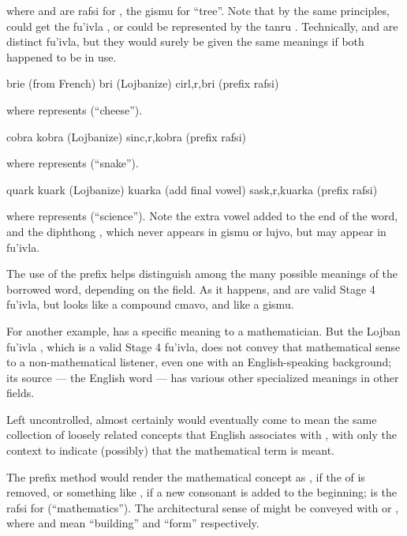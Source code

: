 {\noindent}where  and  are rafsi for , the gismu for ``tree''. Note that by the same principles,  could get the fu'ivla , or could be represented by the tanru . Technically,  and  are distinct fu'ivla, but they would surely be given the same meanings if both happened to be in use.
\begin{example}
brie (from French)\n
bri (Lojbanize)\n
cirl,r,bri (prefix rafsi)
\end{example}

{\noindent}where  represents  (``cheese'').
\begin{example}
cobra\n
kobra (Lojbanize)\n
sinc,r,kobra (prefix rafsi)
\end{example}

{\noindent}where  represents  (``snake'').
\begin{example}
quark\n
kuark (Lojbanize)\n
kuarka (add final vowel)\n
sask,r,kuarka (prefix rafsi)
\end{example}

{\noindent}where  represents  (``science''). Note the extra vowel  added to the end of the word, and the diphthong , which never appears in gismu or lujvo, but may appear in fu'ivla. 

The use of the prefix helps distinguish among the many possible meanings of the borrowed word, depending on the field. As it happens,  and  are valid Stage 4 fu'ivla, but  looks like a compound cmavo, and  like a gismu.

For another example,  has a specific meaning to a mathematician. But the Lojban fu'ivla , which is a valid Stage 4 fu'ivla, does not convey that mathematical sense to a non-mathematical listener, even one with an English-speaking background; its source --- the English word  --- has various other specialized meanings in other fields.

Left uncontrolled,  almost certainly would eventually come to mean the same collection of loosely related concepts that English associates with , with only the context to indicate (possibly) that the mathematical term is meant.

The prefix method would render the mathematical concept as , if the  of  is removed, or something like , if a new consonant is added to the beginning;  is the rafsi for  (``mathematics''). The architectural sense of  might be conveyed with  or , where  and  mean ``building'' and ``form'' respectively.

